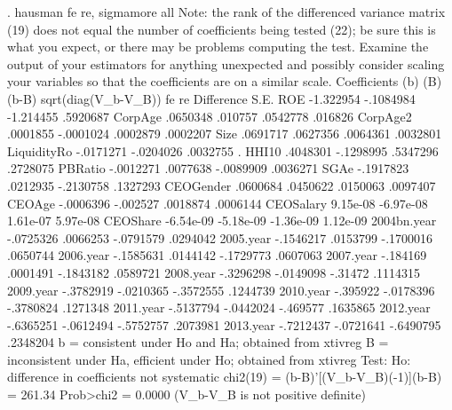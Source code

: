 . hausman fe re, sigmamore all
{\smallskip}
Note: the rank of the differenced variance matrix (19) does not equal the
        number of coefficients being tested (22); be sure this is what you
        expect, or there may be problems computing the test.  Examine the
        output of your estimators for anything unexpected and possibly consider
        scaling your variables so that the coefficients are on a similar scale.
{\smallskip}
                  Coefficients 
             {\VBAR}      (b)          (B)            (b-B)     sqrt(diag(V_b-V_B))
             {\VBAR}       fe           re         Difference          S.E.
         ROE {\VBAR}   -1.322954    -.1084984       -1.214455        .5920687
     CorpAge {\VBAR}    .0650348      .010757        .0542778         .016826
    CorpAge2 {\VBAR}    .0001855    -.0001024        .0002879        .0002207
        Size {\VBAR}    .0691717     .0627356        .0064361        .0032801
LiquidityR{\tytilde}o {\VBAR}   -.0171271    -.0204026        .0032755               .
       HHI10 {\VBAR}    .4048301    -.1298995        .5347296        .2728075
     PBRatio {\VBAR}   -.0012271     .0077638       -.0089909        .0036271
        SGAe {\VBAR}   -.1917823     .0212935       -.2130758        .1327293
   CEOGender {\VBAR}    .0600684     .0450622        .0150063        .0097407
      CEOAge {\VBAR}   -.0006396     -.002527        .0018874        .0006144
   CEOSalary {\VBAR}    9.15e-08    -6.97e-08        1.61e-07        5.97e-08
    CEOShare {\VBAR}   -6.54e-09    -5.18e-09       -1.36e-09        1.12e-09
 2004bn.year {\VBAR}   -.0725326     .0066253       -.0791579        .0294042
   2005.year {\VBAR}   -.1546217     .0153799       -.1700016        .0650744
   2006.year {\VBAR}   -.1585631     .0144142       -.1729773        .0607063
   2007.year {\VBAR}    -.184169     .0001491       -.1843182        .0589721
   2008.year {\VBAR}   -.3296298    -.0149098         -.31472        .1114315
   2009.year {\VBAR}   -.3782919    -.0210365       -.3572555        .1244739
   2010.year {\VBAR}    -.395922    -.0178396       -.3780824        .1271348
   2011.year {\VBAR}   -.5137794    -.0442024        -.469577        .1635865
   2012.year {\VBAR}   -.6365251    -.0612494       -.5752757        .2073981
   2013.year {\VBAR}   -.7212437    -.0721641       -.6490795        .2348204
                         b = consistent under Ho and Ha; obtained from xtivreg
          B = inconsistent under Ha, efficient under Ho; obtained from xtivreg
{\smallskip}
    Test:  Ho:  difference in coefficients not systematic
{\smallskip}
                 chi2(19) = (b-B)'[(V_b-V_B){\caret}(-1)](b-B)
                          =      261.34
                Prob>chi2 =      0.0000
                (V_b-V_B is not positive definite)
